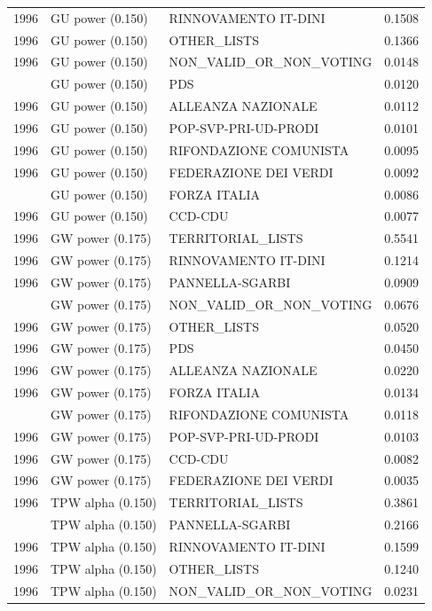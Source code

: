 \begin{longtable}[t]{rllr}
1996 & GU power (0.150) & RINNOVAMENTO IT-DINI & 0.1508\\
1996 & GU power (0.150) & OTHER\_LISTS & 0.1366\\
1996 & GU power (0.150) & NON\_VALID\_OR\_NON\_VOTING & 0.0148\\
\addlinespace
1996 & GU power (0.150) & PDS & 0.0120\\
1996 & GU power (0.150) & ALLEANZA NAZIONALE & 0.0112\\
1996 & GU power (0.150) & POP-SVP-PRI-UD-PRODI & 0.0101\\
1996 & GU power (0.150) & RIFONDAZIONE COMUNISTA & 0.0095\\
1996 & GU power (0.150) & FEDERAZIONE DEI VERDI & 0.0092\\
\addlinespace
1996 & GU power (0.150) & FORZA ITALIA & 0.0086\\
1996 & GU power (0.150) & CCD-CDU & 0.0077\\
1996 & GW power (0.175) & TERRITORIAL\_LISTS & 0.5541\\
1996 & GW power (0.175) & RINNOVAMENTO IT-DINI & 0.1214\\
1996 & GW power (0.175) & PANNELLA-SGARBI & 0.0909\\
\addlinespace
1996 & GW power (0.175) & NON\_VALID\_OR\_NON\_VOTING & 0.0676\\
1996 & GW power (0.175) & OTHER\_LISTS & 0.0520\\
1996 & GW power (0.175) & PDS & 0.0450\\
1996 & GW power (0.175) & ALLEANZA NAZIONALE & 0.0220\\
1996 & GW power (0.175) & FORZA ITALIA & 0.0134\\
\addlinespace
1996 & GW power (0.175) & RIFONDAZIONE COMUNISTA & 0.0118\\
1996 & GW power (0.175) & POP-SVP-PRI-UD-PRODI & 0.0103\\
1996 & GW power (0.175) & CCD-CDU & 0.0082\\
1996 & GW power (0.175) & FEDERAZIONE DEI VERDI & 0.0035\\
1996 & TPW alpha (0.150) & TERRITORIAL\_LISTS & 0.3861\\
\addlinespace
1996 & TPW alpha (0.150) & PANNELLA-SGARBI & 0.2166\\
1996 & TPW alpha (0.150) & RINNOVAMENTO IT-DINI & 0.1599\\
1996 & TPW alpha (0.150) & OTHER\_LISTS & 0.1240\\
1996 & TPW alpha (0.150) & NON\_VALID\_OR\_NON\_VOTING & 0.0231\\

\end{longtable}
